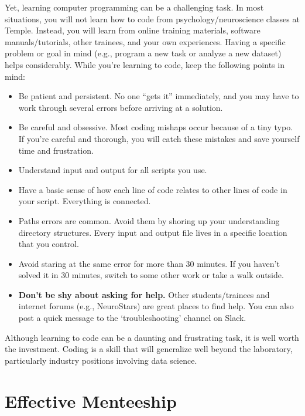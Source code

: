 \documentclass[letterpaper,11pt,oneside]{memoir}
\begin{document}
Yet, learning computer programming can be a challenging task. In most situations, you will not learn how to code from psychology/neuroscience classes at Temple. Instead, you will learn from online training materials, software manuals/tutorials, other trainees, and your own experiences. Having a specific problem or goal in mind (e.g., program a new task or analyze a new dataset) helps considerably. While you're learning to code, keep the following points in mind:

\begin{itemize}

\item Be patient and persistent. No one ``gets it'' immediately, and you may have to work through several errors before arriving at a solution. 
\item Be careful and obsessive. Most coding mishaps occur because of a tiny typo. If you're careful and thorough, you will catch these mistakes and save yourself time and frustration. 
\item Understand input and output for all scripts you use.
\item Have a basic sense of how each line of code relates to other lines of code in your script. Everything is connected. 
\item Paths errors are common. Avoid them by shoring up your understanding directory structures. Every input and output file lives in a specific location that you control. 
\item Avoid staring at the same error for more than 30 minutes. If you haven't solved it in 30 minutes, switch to some other work or take a walk outside.
\item \textbf{Don't be shy about asking for help.} Other students/trainees and internet forums (e.g., NeuroStars) are great places to find help. You can also post a quick message to the `troubleshooting' channel on Slack.

\end{itemize}


\begin{shaded}
\noindent Although learning to code can be a daunting and frustrating task, it is well worth the investment. Coding is a skill that will generalize well beyond the laboratory, particularly industry positions involving data science. 
\end{shaded}


\section{Effective Menteeship}
\end{document}
